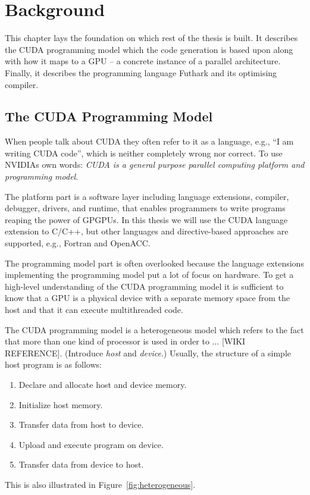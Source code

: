 \chapter{Background}
\label{chap:background}

This chapter lays the foundation on which rest of the thesis
is built. It describes the CUDA programming model which the
code generation is based upon along with how it maps to a
GPU -- a concrete instance of a parallel architecture.
Finally, it describes the programming language Futhark and
its optimising compiler.


\section{The CUDA Programming Model}
\label{sec:cuda}

When people talk about CUDA they often refer to it as a
language, e.g., ``I am writing CUDA code'', which is
neither completely wrong nor correct. To use NVIDIAs own
words: \emph{CUDA is a general purpose parallel computing
  platform and programming model}.

The platform part is a software layer including language
extensions, compiler, debugger, drivers, and runtime, that
enables programmers to write programs reaping the power of
GPGPUs. In this thesis we will use the CUDA language
extension to C/C++, but other languages and directive-based
approaches are supported, e.g., Fortran and OpenACC.

The programming model part is often overlooked because the
language extensions implementing the programming model put a
lot of focus on hardware. To get a high-level understanding
of the CUDA programming model it is sufficient to know that
a GPU is a physical device with a separate memory space from
the host and that it can execute multithreaded code.

The CUDA programming model is a heterogeneous model which
refers to the fact that more than one kind of processor is
used in order to ... [WIKI REFERENCE].  (Introduce \emph{host} and \emph{device}.)  Usually,
the structure of a simple host program is as follows:
%
\begin{enumerate}
  \item Declare and allocate host and device memory.
  \item Initialize host memory.
  \item Transfer data from host to device.
  \item Upload and execute program on device.
  \item Transfer data from device to host.
\end{enumerate}
%
This is also illustrated in Figure~\ref{fig:heterogeneous}.
%

%

